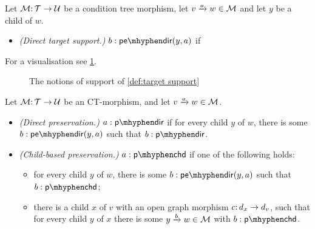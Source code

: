 \begin{definition}\label{def:target support}
Let ${\mathcal{M}}{:}\, {\mathcal{T}}\rightarrow{\mathcal{U}}$ be a condition tree morphism, let $\trip vaw\in\cM$ and let $y$ be a child of $w$.
\begin{itemize}[topsep=\smallskipamount]
\item \emph{(Direct target support.)} $b:\tdir{y,a}$ if 
\end{itemize}
\end{definition}
%
For a visualisation see \cref{fig:target-support}.
%
\begin{figure}
	
	\caption{The notions of support of \cref{def:target support}}
	\label{fig:target-support}
\end{figure}

\begin{definition}
Let ${\mathcal{M}}{:}\, {\mathcal{T}}\rightarrow{\mathcal{U}}$ be an CT-morphism, and let $\trip vaw\in\cM$.
\begin{itemize}[topsep=\smallskipamount]
\item \emph{(Direct preservation.)} $a:\pdir$ if for every child $y$ of $w$, there is some $b:\tdir{y,a}$ such that $b:\pdir$.
\item \emph{(Child-based preservation.)} $a:\pchd$ if one of the following holds:
\begin{itemize}
\item for every child $y$ of $w$, there is some $b:\tdir{y,a}$ such that $b:\pchd$;
\item there is a child $x$ of $v$ with an open graph morphism $c{:}\, d_x\rightarrow d_v$, such that for every child $y$ of $x$ there is some $\trip ybw\in\cM$ with $b:\pchd$.
\end{itemize}
\end{itemize}
\end{definition}

